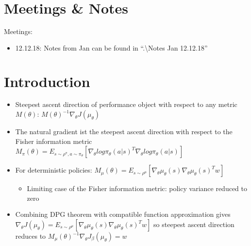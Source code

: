\section{Meetings \& Notes}

Meetings:
\begin{itemize}
	\item 12.12.18: Notes from Jan can be found in ``.\textbackslash Notes Jan 12.12.18''
\end{itemize}



\section{Introduction}
\label{intro}
\begin{itemize}
	\item Steepest ascent direction of performance object with respect to any metric $M(\theta)$: $M(\theta)^{-1}\nabla_{\theta}J(\mu_{\theta})$
	\item The natural gradient ist the steepest ascent direction with respect to the Fisher information metric $M_{\pi}(\theta)=E_{s\sim\rho^{\pi},a\sim\pi_{\theta}}[\nabla_{\theta}log\pi_{\theta}(a|s)^{T}\nabla_{\theta}log\pi_{\theta}(a|s)]$
	\item For deterministic policies: $M_{\mu}(\theta)=E_{s\sim\rho^{\mu}}[\nabla_{\theta}\mu_{\theta}(s)\nabla_{\theta}\mu_{\theta}(s)^{T}w]$
	\begin{itemize}
		\item Limiting case of the Fisher information metric: policy variance reduced to zero
	\end{itemize}
	\item Combining DPG theorem with compatible function approximation gives $\nabla_{\theta}J(\mu_{\theta})=E_{s\sim\rho^{\mu}}[\nabla_{\theta}\mu_{\theta}(s)\nabla_{\theta}\mu_{\theta}(s)^{T}w]$ so steepest ascent direction reduces to $M_{\mu}(\theta)^{-1}\nabla_{\theta}J_{\beta}(\mu_{\theta})=w$
\end{itemize}

